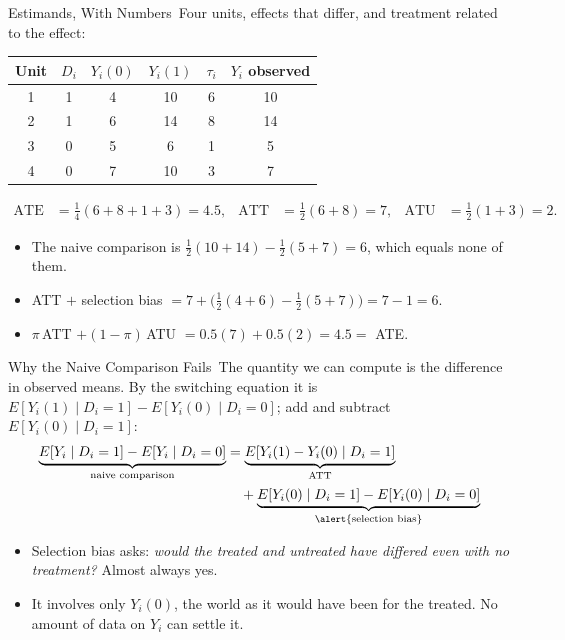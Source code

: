 \documentclass[aspectratio=169,11pt,xcolor=dvipsnames]{beamer}
\newcommand{\E}{E}
\newcommand{\core}{\,\raisebox{0.6pt}{\textcolor{corestar}{$\bigstar$}}}
\begin{document}
\begin{frame}{Estimands, With Numbers\core}
Four units, effects that differ, and treatment related to the effect:
\begin{center}\small
\renewcommand{\arraystretch}{1.15}
\begin{tabular}{cccccc}
\toprule
Unit & $D_i$ & $Y_i(0)$ & $Y_i(1)$ & $\tau_i$ & $Y_i$ observed \\
\midrule
1 & 1 & 4 & 10 & 6 & 10 \\
2 & 1 & 6 & 14 & 8 & 14 \\
3 & 0 & 5 & 6  & 1 & 5 \\
4 & 0 & 7 & 10 & 3 & 7 \\
\bottomrule
\end{tabular}
\end{center}
\begin{align*}
  \text{ATE} &= \tfrac14(6+8+1+3) = 4.5, &
  \text{ATT} &= \tfrac12(6+8) = 7, &
  \text{ATU} &= \tfrac12(1+3) = 2 .
\end{align*}
\begin{itemize}\itemsep2pt
  \item The naive comparison is $\tfrac12(10+14) - \tfrac12(5+7) = 6$,
        which equals none of them.
  \item ATT $+$ selection bias
        $= 7 + \big(\tfrac12(4+6) - \tfrac12(5+7)\big) = 7 - 1 = 6$.
        \checkmark
  \item $\pi\,$ATT $+ (1-\pi)\,$ATU $= 0.5(7)+0.5(2) = 4.5 = $ ATE.
        \checkmark
\end{itemize}
\end{frame}

\begin{frame}{Why the Naive Comparison Fails\core}
The quantity we can compute is the difference in observed means. By the
switching equation it is $\E[Y_i(1)\mid D_i=1] - \E[Y_i(0)\mid D_i=0]$;
add and subtract $\E[Y_i(0)\mid D_i=1]$:
\begin{align*}
  \underbrace{\E[Y_i \mid D_i = 1] - \E[Y_i\mid D_i=0]}_{\text{naive comparison}}
  &= \underbrace{\E[Y_i(1) - Y_i(0)\mid D_i=1]}_{\text{ATT}} \\
  &\quad + \underbrace{\E[Y_i(0)\mid D_i=1] - \E[Y_i(0)\mid D_i=0]}_{\alert{\text{selection bias}}}
\end{align*}
\begin{itemize}\itemsep3pt
  \item Selection bias asks: \emph{would the treated and untreated have
        differed even with no treatment?} Almost always yes.
  \item It involves \alert{only} $Y_i(0)$, the world as it would have been for
        the treated. No amount of data on $Y_i$ can settle it.
\end{itemize}
\end{frame}
\end{document}
